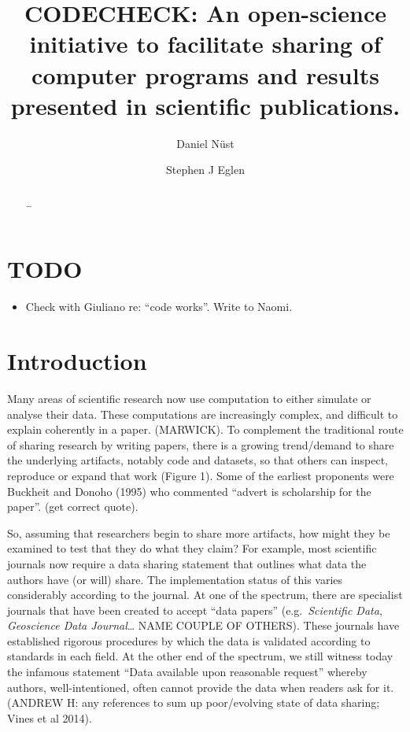 \documentclass[12pt]{article}
\begin{document}
\title{CODECHECK: An open-science initiative to facilitate sharing of
  computer programs and results presented in scientific publications.}
\author[1,$\ast$]{Daniel N\"{u}st}
\author[2,$\ast$]{Stephen J Eglen}
\maketitle
\begin{abstract}
\ldots{}
\end{abstract}

\section*{TODO}\label{todo}

\begin{itemize}
\item Check with Giuliano re: ``code works''. Write to Naomi.
\end{itemize}

\section*{Introduction}\label{introduction}

Many areas of scientific research now use computation to either simulate
or analyse their data. These computations are increasingly complex, and
difficult to explain coherently in a paper. (MARWICK). To complement the
traditional route of sharing research by writing papers, there is a
growing trend/demand to share the underlying artifacts, notably code and
datasets, so that others can inspect, reproduce or expand that work
(Figure 1). Some of the earliest proponents were Buckheit and Donoho
(1995) who commented ``advert is scholarship for the paper''. (get
correct quote).

So, assuming that researchers begin to share more artifacts, how might
they be examined to test that they do what they claim? For example,
most scientific journals now require a data sharing statement that
outlines what data the authors have (or will) share. The
implementation status of this varies considerably according to the
journal. At one of the spectrum, there are specialist journals that
have been created to accept ``data papers'' (e.g.~\emph{Scientific
  Data}, \textit{Geoscience Data Journal}\ldots{} NAME COUPLE OF
OTHERS). These journals have established rigorous procedures by which
the data is validated according to standards in each field. At the
other end of the spectrum, we still witness today the infamous
statement ``Data available upon reasonable request'' whereby authors,
well-intentioned, often cannot provide the data when readers ask for
it.  (ANDREW H: any references to sum up poor/evolving state of data
sharing; Vines et al 2014).
\end{document}
